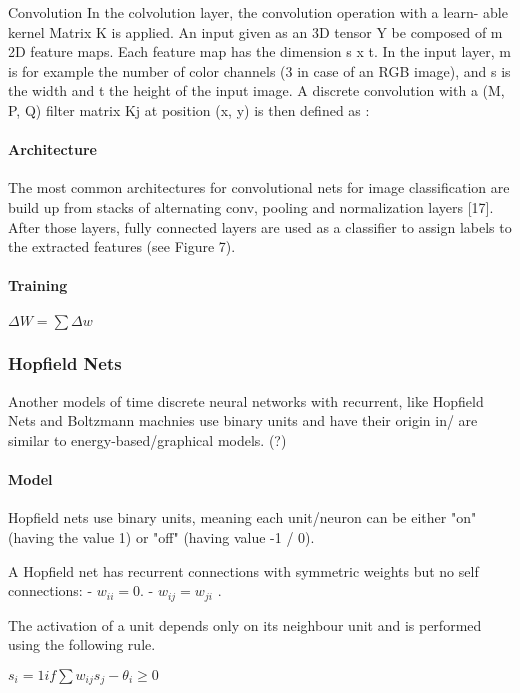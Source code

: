 Convolution In the colvolution layer, the convolution operation with a learn-
able kernel Matrix K is applied. An input given as an 3D tensor Y be composed
of m 2D feature maps. Each feature map has the dimension s x t. In the input
layer, m is for example the number of color channels (3 in case of an RGB image),
and s is the width and t the height of the input image. A discrete convolution
with a (M, P, Q) filter matrix Kj at position (x, y) is then defined as :



\paragraph{Architecture}

The most common architectures for convolutional nets for image classification
are build up from stacks of alternating conv, pooling and normalization layers
[17]. After those layers, fully connected layers are used as a classifier to assign
labels to the extracted features (see Figure 7).


\paragraph{Training}

$\Delta W = \sum \Delta w$


\subsubsection{Hopfield Nets}

Another models of time discrete neural networks with recurrent, like Hopfield Nets and Boltzmann machnies use binary units and have their origin in/ are similar to energy-based/graphical models. (?)   

\paragraph{Model}

Hopfield nets use binary units, meaning each unit/neuron can be either "on" (having the value 1) or "off" (having value -1 / 0). 

A Hopfield net has recurrent connections with symmetric weights but no self connections:
- $w_{ii} = 0 $.
- $w_{ij} = w_{ji}$ .

The activation of a unit depends only on its neighbour unit and is performed using the following rule.

$s_i = 1 if \sum w_{ij} s_{j} - \theta_{i} \ge 0$ 

